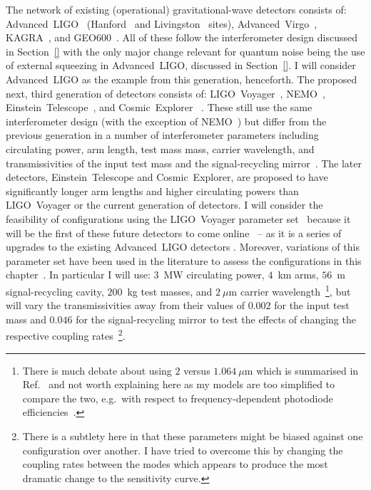 The network of existing (operational) gravitational-wave detectors consists of: Advanced~LIGO~\cite{} (Hanford~\cite{} and Livingston~\cite{} sites), Advanced~Virgo~\cite{}, KAGRA~\cite{}, and GEO600~\cite{}. All of these follow the interferometer design discussed in Section~\ref{} with the only major change relevant for quantum noise  being the use of external squeezing in Advanced~LIGO, discussed in Section~\ref{}. I will consider Advanced~LIGO as the example from this generation, henceforth. 
The proposed next, third generation of  detectors consists of: LIGO~Voyager~\cite{}, NEMO~\cite{}, Einstein~Telescope~\cite{}, and Cosmic~Explorer~\cite{} . These still use the same interferometer design (with the exception of NEMO~\cite{})  but differ from the previous generation in a number of interferometer parameters including circulating power, arm length, test mass mass, carrier wavelength, and transmissivities of the input test mass and the signal-recycling mirror~\cite{}. 
The later detectors, Einstein~Telescope and Cosmic~Explorer, are proposed to have significantly longer arm lengths and higher circulating powers than LIGO~Voyager or the current generation of detectors. 
I will consider the feasibility of configurations using the LIGO~Voyager parameter set~\cite{} because it will be the first of these future detectors to come online~\cite{} -- as it is a series of upgrades to the existing Advanced~LIGO detectors . Moreover, variations of this parameter set have been used in the literature to assess the configurations in this chapter~\cite{Li2020,Miao2018,Adya2020}. In particular I will use: $3$~MW circulating power, $4$~km arms, $56$~m signal-recycling cavity, $200$~kg test masses, and $2~\mu\text{m}$ carrier wavelength~\footnote{There is much debate about using $2$ versus $1.064~\mu\text{m}$ which is summarised in Ref.~\cite{} and not worth explaining here as my models are too simplified to compare the two, e.g.\ with respect to frequency-dependent photodiode efficiencies~\cite{}. }, but will vary the transmissivities away from their values of $0.002$ for the input test mass and $0.046$ for the signal-recycling mirror to test the effects of changing the respective coupling rates~\footnote{There is a subtlety here in that these parameters might be biased against one configuration over another. I have tried to overcome this by changing the coupling rates between the modes which appears to produce the most dramatic change to the sensitivity curve. }. 

